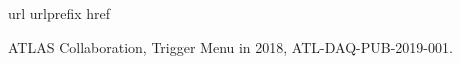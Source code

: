 \begin{thebibliography}{10}
\makeatletter
\renewcommand\@biblabel[1]{}
\makeatother
\expandafter\ifx\csname url\endcsname\relax
  \def\url#1{\texttt{#1}}\fi
\expandafter\ifx\csname urlprefix\endcsname\relax\def\urlprefix{URL }\fi
\expandafter\ifx\csname href\endcsname\relax
  \def\href#1#2{#2} \def\path#1{#1}\fi

{ATLAS Collaboration}, {Trigger Menu
  in 2018}, \href{https://cds.cern.ch/record/2693402}{ATL-DAQ-PUB-2019-001}.  
\end{thebibliography}

